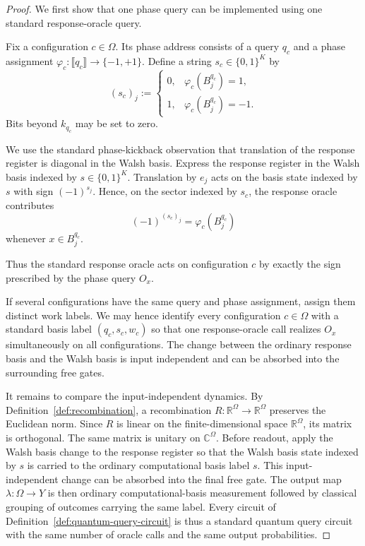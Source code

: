 \documentclass[11pt]{article}
\numberwithin{equation}{section}
\theoremstyle{remark}
\begin{document}
\begin{proof}
We first show that one phase query can be implemented using one standard
response-oracle query.

Fix a configuration $c\in\Omega$. Its phase address consists of a query $q_c$ and a phase assignment $\varphi_c:\llbracket q_c\rrbracket\to\{-1,+1\}$. Define a string $s_c\in\{0,1\}^K$ by
\begin{equation}
    (s_c)_j
    :=
    \begin{cases}
        0,&\varphi_c(B_j^{q_c})=1,\\
        1,&\varphi_c(B_j^{q_c})=-1.
    \end{cases}
\end{equation}
Bits beyond $k_{q_c}$ may be set to zero.

We use the standard phase-kickback observation that translation of the response register is diagonal in the Walsh basis. Express the response register in the Walsh basis indexed by $s\in\{0,1\}^K$. Translation by $e_j$ acts on the basis state indexed by
$s$ with sign $(-1)^{s_j}$. Hence, on the sector indexed by $s_c$, the
response oracle contributes
\begin{equation}
    (-1)^{(s_c)_j}
    =
    \varphi_c(B_j^{q_c})
\end{equation}
whenever $x\in B_j^{q_c}$.

Thus the standard response oracle acts on configuration $c$ by exactly the
sign prescribed by the phase query $O_x$.

If several configurations have the same query and phase assignment, assign
them distinct work labels. We may hence identify every configuration
$c\in\Omega$ with a standard basis label $(q_c,s_c,w_c)$ so that one
response-oracle call realizes $O_x$ simultaneously on all configurations.
The change between the ordinary response basis and the Walsh basis is input
independent and can be absorbed into the surrounding free gates.

It remains to compare the input-independent dynamics. By Definition~\ref{def:recombination}, a recombination $R:\mathbb R^\Omega\to\mathbb R^\Omega$ preserves the Euclidean norm. Since $R$ is linear on the finite-dimensional space $\mathbb R^\Omega$, its matrix is orthogonal. The same matrix is unitary on $\mathbb C^\Omega$. Before readout, apply the Walsh basis change to the response register so that
the Walsh basis state indexed by $s$ is carried to the ordinary computational
basis label $s$. This input-independent change can be absorbed into the final
free gate. The output map $\lambda:\Omega\to Y$ is then ordinary
computational-basis measurement followed by classical grouping of outcomes
carrying the same label. Every circuit of
Definition~\ref{def:quantum-query-circuit} is thus a standard quantum
query circuit with the same number of oracle calls and the same output
probabilities.


\end{proof}
\end{document}
